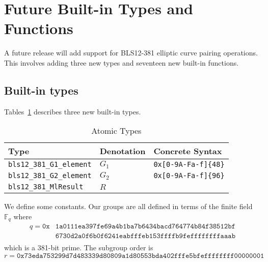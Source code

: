 \renewcommand{\note}[1]{
  \bigskip
  \refstepcounter{notenumberC}
  \noindent\textbf{Note \thenotenumberC. #1}
}

\newpage

\section{Future Built-in Types and Functions}
\label{appendix:default-builtins-future}
A future release will add support for BLS12-381 elliptic curve pairing
operations.  This involves adding three new types and seventeen new built-in
functions.

\subsection{Built-in types}
\label{sec:future-built-in-types}
Tables~\ref{table:future-built-in-types} describes three new built-in
types.

\newcommand{\MlResult}{R}
\newcommand{\Fq}{\mathbb{F}_q}
\newcommand{\Fqq}{\mathbb{F}_{q^2}}
\newcommand{\FF}{\mathbb{F}_{q^{12}}}

\begin{table}[H]
  \centering
    \begin{tabular}{|l|p{6cm}|l|}
        \hline
        Type & Denotation & Concrete Syntax\\
        \hline
        \texttt{bls12\_381\_G1\_element} &   $G_1$ & \texttt{0x[0-9A-Fa-f]\{48\}}\\
        \texttt{bls12\_381\_G2\_element} &   $G_2$ & \texttt{0x[0-9A-Fa-f]\{96\}}\\
        \texttt{bls12\_381\_MlResult}    &   $\MlResult$  &  \\
        \hline
    \end{tabular}
    \caption{Atomic Types}
    \label{table:future-built-in-types}
\end{table}


We define some constants.  Our groups are all defined in terms of the  finite field $\Fq$ where
\begin{align*}
q = \mathtt{0x}&\mathtt{1a0111ea397fe69a4b1ba7b6434bacd764774b84f38512bf}\\
              &\mathtt{6730d2a0f6b0f6241eabfffeb153ffffb9feffffffffaaab}\\
\end{align*}
which is a 381-bit prime.  The subgroup order is
$$
r = \mathtt{0x73eda753299d7d483339d80809a1d80553bda402fffe5bfeffffffff00000001}
$$

